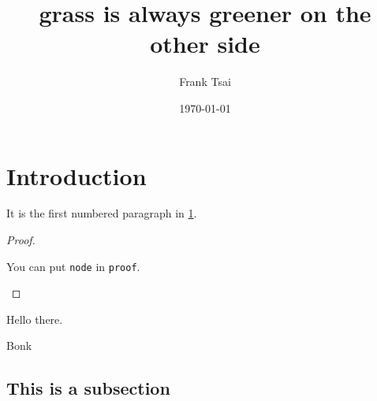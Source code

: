 \documentclass{zett}
\title{grass is always greener on the other side}
\author{Frank Tsai}
\date{\today}
\begin{document}
\maketitle
\tableofcontents

\section{Introduction}
\label{sec:introduction}

\begin{node}
  \label{node:hello}
  It is the first numbered paragraph in \cref{sec:introduction}.
\end{node}

\begin{proof}
  \begin{node}
    \label{node:hello2}
    You can put \verb|node| in \verb|proof|.
  \end{node}
\end{proof}

\begin{thm}
  Hello there.
\end{thm}

\begin{rmk}
  Bonk
\end{rmk}

\subsection{This is a subsection}
\label{sec:this-is-a-subsection}





\end{document}
